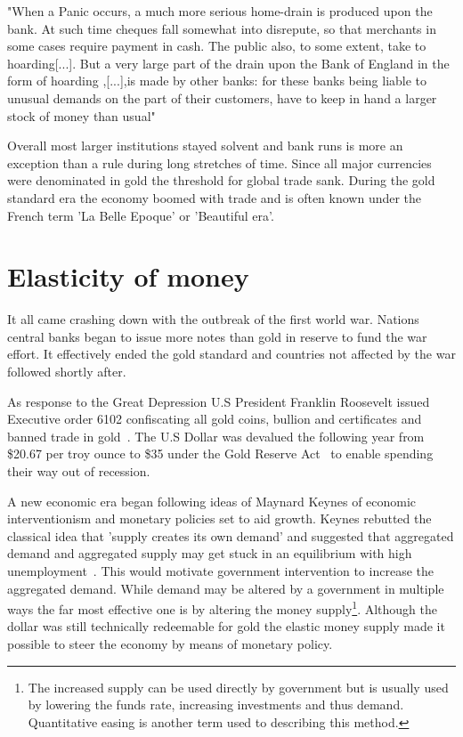 \begin{displayquote}
	"When a Panic occurs, a much more serious home-drain is produced upon the bank. At such time cheques fall somewhat into disrepute, so that merchants in some cases require payment in cash. The public also, to some extent, take to hoarding[...]. But a very large part of the drain upon the Bank of England in the form of hoarding ,[...],is made by other banks: for these banks being liable to unusual demands on the part of their customers, have to keep in hand a larger stock of money than usual"~\cite{patterson:monetary:drains}
\end{displayquote}

Overall most larger institutions stayed solvent and bank runs is more an exception than a rule during long stretches of time. Since all major currencies were denominated in gold the threshold for global trade sank. During the gold standard era the economy boomed with trade and is often known under the French term 'La Belle Epoque' or 'Beautiful era'. 

\onecolumn

\section{Elasticity of money}

It all came crashing down with the outbreak of the first world war. Nations central banks began to issue more notes than gold in reserve to fund the war effort. It effectively ended the gold standard and countries not affected by the war followed shortly after.

As response to the Great Depression U.S President Franklin Roosevelt issued Executive order 6102 confiscating all gold coins, bullion and certificates and banned trade in gold~\cite{roosevelt:6102}. The U.S Dollar was devalued the following year from \$20.67 per troy ounce to \$35 under the Gold Reserve Act~\cite{gold:reserve:act} to enable spending their way out of recession. 

A new economic era began following ideas of Maynard Keynes of economic interventionism and monetary policies set to aid growth. Keynes rebutted the classical idea that 'supply creates its own demand' and suggested that aggregated demand and aggregated supply may get stuck in an equilibrium with high unemployment~\cite{keynes:general:theory}. This would motivate government intervention to increase the aggregated demand. While demand may be altered by a government in multiple ways the far most effective one is by altering the money supply\footnote{The increased supply can be used directly by government but is usually used by lowering the funds rate, increasing investments and thus demand. Quantitative easing is another term used to describing this method. }. Although the dollar was still technically redeemable for gold the elastic money supply made it possible to steer the economy by means of monetary policy. 

